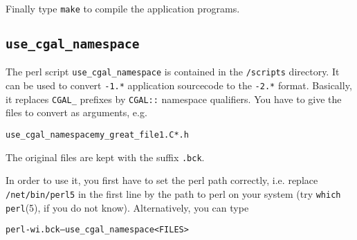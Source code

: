 Finally type \texttt{make} to compile the application programs.

\subsection{\texttt{use\_cgal\_namespace}}\label{sec:use_cgal_namespace}

The perl script \texttt{use\_cgal\_namespace} is contained in the
\cgaldir\texttt{/scripts} directory. It can be used to convert
\cgal\texttt{-1.*} application sourcecode to the \cgal\texttt{-2.*}
format.  Basically, it replaces \texttt{CGAL\_} prefixes by
\texttt{CGAL::} namespace qualifiers. You have to give the files to
convert as arguments, e.g.
\begin{alltt}
  use_cgal_namespace my_great_file1.C *.h
\end{alltt}
The original files are kept with the suffix \texttt{.bck}.

In order to use it, you first have to set the perl path correctly,
i.e. replace \texttt{/net/bin/perl5} in the first line by the path to
perl on your system (try \texttt{which perl}(5), if you do not know).
Alternatively, you can type
\begin{alltt}
  perl -wi.bck -- use_cgal_namespace <FILES>
\end{alltt}

\lcTex{\end{appendix}}



